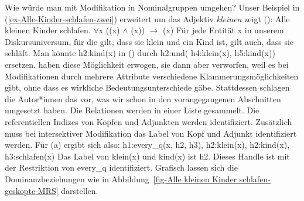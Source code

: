 Wie würde man mit Modifikation in Nominalgruppen umgehen? Unser Beispiel in (\ref{ex-Alle-Kinder-schlafen-zwei}) erweitert um das
Adjektiv \emph{kleinen} zeigt ():
\eal
\ex Alle kleinen Kinder schlafen.
\ex\label{ex-Aussagenlogik-Alle kleinen Kinder schlafen}
$\forall$x ((x) $\wedge$ (x)) $\to$ (x)
\ex Für jede Entität x in unserem Diskursuniversum, für die gilt, dass sie klein und ein Kind ist, gilt auch,
dass sie schläft.
\zl
Man könnte h2:kind(x) in () durch h2:und( h4:klein(x), h5:kind(x))
ersetzen. \citet[]{CFPS2005a} haben diese Möglichkeit erwogen, sie dann aber verworfen, weil es bei
Modifikationen durch mehrere Attribute verschiedene Klammerungsmöglichkeiten gibt, ohne dass es
wirkliche Bedeutungsunterschiede gäbe. Stattdessen schlagen die Autor*innen das vor, was wir schon
in den vorangegangenen Abschnitten umgesetzt haben. Die Relationen werden in einer Liste
gesammelt. Die referentiellen Indizes von Köpfen und Adjunkten werden identifiziert. Zusätzlich muss
bei intersektiver Modifikation das Label von Kopf und Adjunkt identifiziert werden.
Für (a) ergibt sich also:
\ea
\label{ex-every-klein-kind-schlafen}
h1:every\_q(x, h2, h3), h2:klein(x), h2:kind(x), h3:schlafen(x)
\z
Das Label von klein(x) und kind(x) ist h2. Dieses Handle ist mit der Restriktion von every\_q
identifiziert. Grafisch lassen sich die Dominanzbeziehungen wie in Abbildung~\ref{fig-Alle
  kleinen Kinder schlafen-geskopte-MRS} darstellen.

